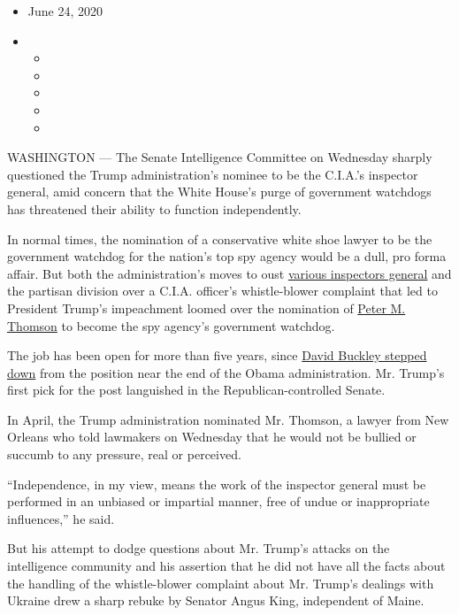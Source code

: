 \begin{itemize}
\item
  June 24, 2020
\item
  \begin{itemize}
  \item
  \item
  \item
  \item
  \item
  \end{itemize}
\end{itemize}

WASHINGTON --- The Senate Intelligence Committee on Wednesday sharply
questioned the Trump administration's nominee to be the C.I.A.'s
inspector general, amid concern that the White House's purge of
government watchdogs has threatened their ability to function
independently.

In normal times, the nomination of a conservative white shoe lawyer to
be the government watchdog for the nation's top spy agency would be a
dull, pro forma affair. But both the administration's moves to oust
\href{https://www.nytimes.com/2020/05/19/podcasts/the-daily/inspector-general-firing-trump.html?showTranscript=1}{various
inspectors general} and the partisan division over a C.I.A. officer's
whistle-blower complaint that led to President Trump's impeachment
loomed over the nomination of
\href{https://fedsoc.org/contributors/peter-thomson}{Peter M. Thomson}
to become the spy agency's government watchdog.

The job has been open for more than five years, since
\href{https://www.theguardian.com/us-news/2015/jan/05/cia-inspector-general-david-buckley-exit\#:~:text=The\%20CIA\%20inspector\%20general\%2C\%20David,the\%20CIA\%20said\%20on\%20Monday.}{David
Buckley stepped down} from the position near the end of the Obama
administration. Mr. Trump's first pick for the post languished in the
Republican-controlled Senate.

In April, the Trump administration nominated Mr. Thomson, a lawyer from
New Orleans who told lawmakers on Wednesday that he would not be bullied
or succumb to any pressure, real or perceived.

``Independence, in my view, means the work of the inspector general must
be performed in an unbiased or impartial manner, free of undue or
inappropriate influences,'' he said.

But his attempt to dodge questions about Mr. Trump's attacks on the
intelligence community and his assertion that he did not have all the
facts about the handling of the whistle-blower complaint about Mr.
Trump's dealings with Ukraine drew a sharp rebuke by Senator Angus King,
independent of Maine.

